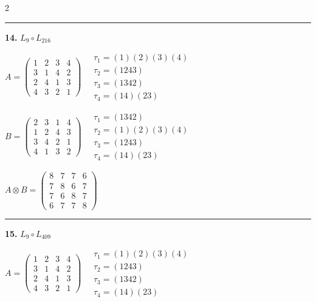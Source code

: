 \begin{multicols}{2}
\vspace{0.3em}
\hrule
\vspace{0.3em}

\noindent\textbf{14.} $L_{9} \circ L_{216}$

$A = \begin{pmatrix} 1 & 2 & 3 & 4 \\ 3 & 1 & 4 & 2 \\ 2 & 4 & 1 & 3 \\ 4 & 3 & 2 & 1 \end{pmatrix} \quad \begin{matrix} \tau_{1}=(1)(2)(3)(4) \\ \tau_{2}=(1 2 4 3) \\ \tau_{3}=(1 3 4 2) \\ \tau_{4}=(1 4)(2 3) \end{matrix}$

$B = \begin{pmatrix} 2 & 3 & 1 & 4 \\ 1 & 2 & 4 & 3 \\ 3 & 4 & 2 & 1 \\ 4 & 1 & 3 & 2 \end{pmatrix} \quad \begin{matrix} \tau_{1}=(1 3 4 2) \\ \tau_{2}=(1)(2)(3)(4) \\ \tau_{3}=(1 2 4 3) \\ \tau_{4}=(1 4)(2 3) \end{matrix}$

$A \otimes B = \begin{pmatrix} 8 & 7 & 7 & 6 \\ 7 & 8 & 6 & 7 \\ 7 & 6 & 8 & 7 \\ 6 & 7 & 7 & 8 \end{pmatrix}$

\vspace{0.3em}
\hrule
\vspace{0.3em}

\noindent\textbf{15.} $L_{9} \circ L_{409}$

$A = \begin{pmatrix} 1 & 2 & 3 & 4 \\ 3 & 1 & 4 & 2 \\ 2 & 4 & 1 & 3 \\ 4 & 3 & 2 & 1 \end{pmatrix} \quad \begin{matrix} \tau_{1}=(1)(2)(3)(4) \\ \tau_{2}=(1 2 4 3) \\ \tau_{3}=(1 3 4 2) \\ \tau_{4}=(1 4)(2 3) \end{matrix}$


\end{multicols}
